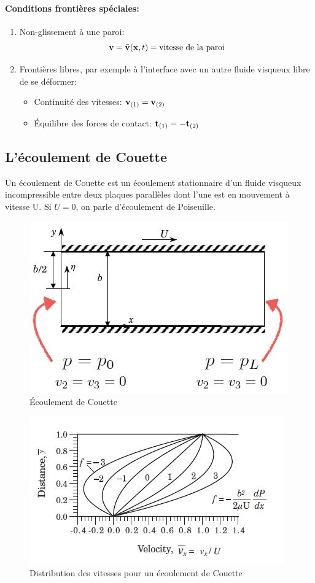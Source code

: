 \paragraph{Conditions frontières spéciales: }

\begin{enumerate}
\item Non-glissement à une paroi: $$\textbf{v}=\bar{\textbf{v}}(\textbf{x},t)=\text{vitesse de la paroi}$$
\item Frontières libres, par exemple à l'interface avec un autre fluide visqueux libre de se déformer:
	\begin{itemize}
	\item Continuité des vitesses: $\textbf{v}_{(1)}=\textbf{v}_{(2)}$
	\item \'Equilibre des forces de contact: $\textbf{t}_{(1)}=-\textbf{t}_{(2)}$
	\end{itemize}
\end{enumerate}

\subsection{L'écoulement de Couette}
Un écoulement de Couette est un écoulement stationnaire d'un fluide visqueux incompressible entre deux plaques parallèles dont l'une est en mouvement à vitesse U. Si $U=0$, on parle d'écoulement de Poiseuille.
\begin{figure}[!h]
\centering
\includegraphics[scale=0.6]{./couette.jpg}
\caption{\'Ecoulement de Couette}
\label{fig:couette}
\end{figure}

\begin{figure}[!h]
\centering
\includegraphics[scale=0.6]{./couettegraphe.jpg}
\caption{Distribution des vitesses pour un écoulement de Couette}
\label{couettegraphe}
\end{figure}

